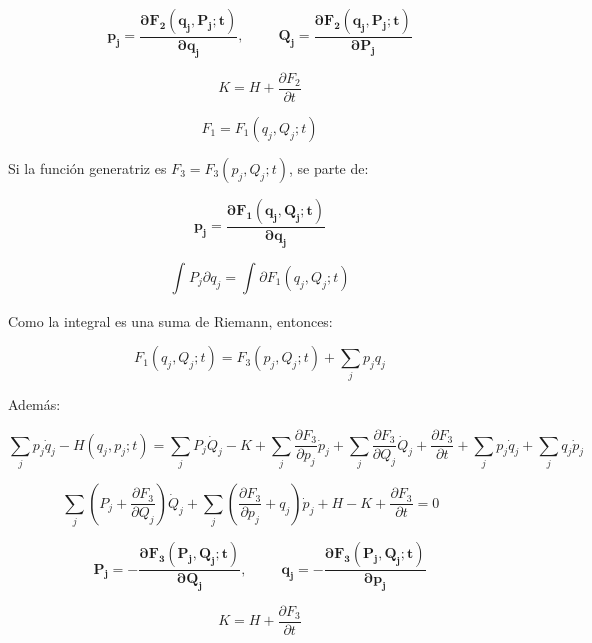 \documentclass[]{article}
\begin{document}
\[\mathbf{p}_{\mathbf{j}}\mathbf{=}\frac{\mathbf{\partial}\mathbf{F}_{\mathbf{2}}\left( \mathbf{q}_{\mathbf{j}}\mathbf{,}\mathbf{P}_{\mathbf{j}}\mathbf{;t} \right)}{\mathbf{\partial}\mathbf{q}_{\mathbf{j}}}\mathbf{,\ \ \ \ \ \ \ \ \ \ \ }\mathbf{Q}_{\mathbf{j}}\mathbf{=}\frac{\mathbf{\partial}\mathbf{F}_{\mathbf{2}}\left( \mathbf{q}_{\mathbf{j}}\mathbf{,}\mathbf{P}_{\mathbf{j}}\mathbf{;t} \right)}{\mathbf{\partial}\mathbf{P}_{\mathbf{j}}}\]

\[K = H + \frac{\partial F_{2}}{\partial t}\]

\[F_{1} = F_{1}\left( q_{j},Q_{j};t \right)\]

Si la función generatriz es
\(F_{3} = F_{3}\left( p_{j},Q_{j};t \right)\), se parte de:

\[\mathbf{p}_{\mathbf{j}}\mathbf{=}\frac{\mathbf{\partial}\mathbf{F}_{\mathbf{1}}\left( \mathbf{q}_{\mathbf{j}}\mathbf{,}\mathbf{Q}_{\mathbf{j}}\mathbf{;t} \right)}{\mathbf{\partial}\mathbf{q}_{\mathbf{j}}}\]

\[\int_{}^{}{P_{j}\partial q_{j} = \int_{}^{}{\partial F_{1}\left( q_{j},Q_{j};t \right)}}\]

Como la integral es una suma de Riemann, entonces:

\[F_{1}\left( q_{j},Q_{j};t \right) = F_{3}\left( p_{j},Q_{j};t \right) + \sum_{j}^{}{p_{j}q_{j}}\]

Además:

\[\sum_{j}^{}{p_{j}{\dot{q}}_{j} - H\left( q_{j},p_{j};t \right)} = \sum_{j}^{}{P_{j}{\dot{Q}}_{j}} - K + \sum_{j}^{}\frac{\partial F_{3}}{\partial p_{j}}{\dot{p}}_{j} + \sum_{j}^{}\frac{\partial F_{3}}{\partial Q_{j}}{\dot{Q}}_{j} + \frac{\partial F_{3}}{\partial t} + \sum_{j}^{}p_{j}{\dot{q}}_{j} + \sum_{j}^{}q_{j}{\dot{p}}_{j}\]

\[\sum_{j}^{}\left( P_{j} + \frac{\partial F_{3}}{\partial Q_{j}} \right){\dot{Q}}_{j} + \sum_{j}^{}\left( \frac{\partial F_{3}}{\partial p_{j}} + q_{j} \right){\dot{p}}_{j} + H - K + \frac{\partial F_{3}}{\partial t} = 0\ \ \ \ \ \ \]

\[\mathbf{P}_{\mathbf{j}}\mathbf{= -}\frac{\mathbf{\partial}\mathbf{F}_{\mathbf{3}}\left( \mathbf{P}_{\mathbf{j}}\mathbf{,}\mathbf{Q}_{\mathbf{j}}\mathbf{;t} \right)}{\mathbf{\partial}\mathbf{Q}_{\mathbf{j}}}\mathbf{,\ \ \ \ \ \ \ \ \ \ \ }\mathbf{q}_{\mathbf{j}}\mathbf{= -}\frac{\mathbf{\partial}\mathbf{F}_{\mathbf{3}}\left( \mathbf{P}_{\mathbf{j}}\mathbf{,}\mathbf{Q}_{\mathbf{j}}\mathbf{;t} \right)}{\mathbf{\partial}\mathbf{p}_{\mathbf{j}}}\]

\[K = H + \frac{\partial F_{3}}{\partial t}\]
\end{document}
